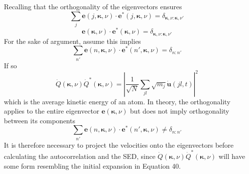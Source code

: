 Recalling that the orthogonality of the eigenvectors ensures 
\begin{equation}
\sum_{j}\bm{e}(j,\bm{\kappa},\nu)\cdot\bm{e}^*(j,\bm{\kappa},\nu)= \delta_{\bm{\kappa},\nu:\bm{\kappa},\nu'}
\end{equation}
\begin{equation}
\bm{e}(\bm{\kappa},\nu)\cdot\bm{e}^*(\bm{\kappa},\nu)= \delta_{\bm{\kappa},\nu:\bm{\kappa},\nu'}
\end{equation}
For the sake of argument, assume this implies
\begin{equation}
\sum_{n'}\bm{e}(n,\bm{\kappa},\nu)\cdot\bm{e}^*(n',\bm{\kappa},\nu)=\delta_{n:n'}
\end{equation}
If so
\begin{equation}
\dot{Q}(\bm{\kappa},\nu)\dot{Q}^*(\bm{\kappa},\nu)=|\frac{1}{\sqrt{N}}\sum_{jl}\sqrt{m_j}\dot{\bm{u}}(jl,t)|^2
\end{equation}
which is the average kinetic energy of an atom. In theory, the orthogonality applies to the entire eigenvector $\bm{e}(\bm{\kappa},\nu)$ but does not imply orthogonality between its components
\begin{equation}
\sum_{n'}\bm{e}(n,\bm{\kappa},\nu)\cdot\bm{e}^*(n',\bm{\kappa},\nu)\neq\delta_{n:n'}
\end{equation}
It is therefore necessary to project the velocities onto the eigenvectors before calculating the autocorrelation and the SED, since $\dot{Q}(\bm{\kappa},\nu)\dot{Q}^*(\bm{\kappa},\nu)$ will have some form resembling the initial expansion in Equation 40.


